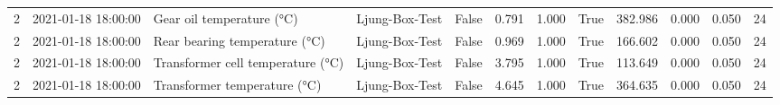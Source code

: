 \begin{tabular}{rlllrrrrrrrr}
2 & 2021-01-18 18:00:00 & Gear oil temperature (°C) & Ljung-Box-Test & False & 0.791 & 1.000 & True & 382.986 & 0.000 & 0.050 & 24 \\
2 & 2021-01-18 18:00:00 & Rear bearing temperature (°C) & Ljung-Box-Test & False & 0.969 & 1.000 & True & 166.602 & 0.000 & 0.050 & 24 \\
2 & 2021-01-18 18:00:00 & Transformer cell temperature (°C) & Ljung-Box-Test & False & 3.795 & 1.000 & True & 113.649 & 0.000 & 0.050 & 24 \\
2 & 2021-01-18 18:00:00 & Transformer temperature (°C) & Ljung-Box-Test & False & 4.645 & 1.000 & True & 364.635 & 0.000 & 0.050 & 24 \\
\bottomrule
\end{tabular}
